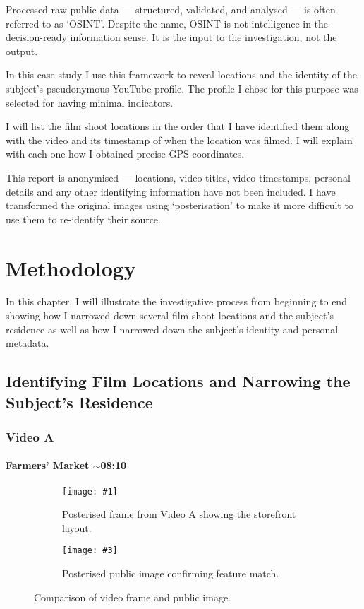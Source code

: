 \documentclass[a4paper,11pt]{report}
\newcommand{\comparison}[5] {
    \begin{figure}[htbp]
        \centering
        
        \begin{subfigure}[t]{0.45\textwidth}
            \centering
            \texttt{[image: \#1]}
            \caption{#2}
        \end{subfigure}
        \hfill
        \begin{subfigure}[t]{0.45\textwidth}
            \centering
            \texttt{[image: \#3]}
            \caption{#4}
        \end{subfigure}
    
        \caption{#5}
    \end{figure}
}
\begin{document}
Processed raw public data --- structured, validated, and analysed --- is often referred to as `OSINT'. Despite the name, OSINT is not intelligence in the decision-ready information sense. It is the input to the investigation, not the output.

In this case study I use this framework to reveal locations and the identity of the subject's pseudonymous YouTube profile. The profile I chose for this purpose was selected for having minimal indicators.

I will list the film shoot locations in the order that I have identified them along with the video and its timestamp of when the location was filmed. I will explain with each one how I obtained precise GPS coordinates.

This report is anonymised --- locations, video titles, video timestamps, personal details and any other identifying information have not been included. I have transformed the original images using `posterisation' to make it more difficult to use them to re-identify their source.

\chapter{Methodology}

In this chapter, I will illustrate the investigative process from beginning to end showing how I narrowed down several film shoot locations and the subject's residence as well as how I narrowed down the subject's identity and personal metadata.

\section{Identifying Film Locations and Narrowing the Subject's Residence}

\subsection{Video A}

\subsubsection{Farmers' Market $\sim$08:10}

\comparison
    {images/grocery-youtube.png}
    {Posterised frame from Video A showing the storefront layout.}
    {images/grocery-streetview.png}
    {Posterised public image confirming feature match.}
    {Comparison of video frame and public image.}
    
\end{document}
